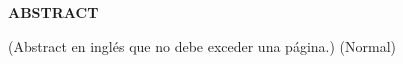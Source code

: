 

\begin{center}
    \textbf{ABSTRACT}
\end{center}
\vspace{1cm}
(Abstract en inglés que no debe exceder una página.) (Normal)
\newpage
